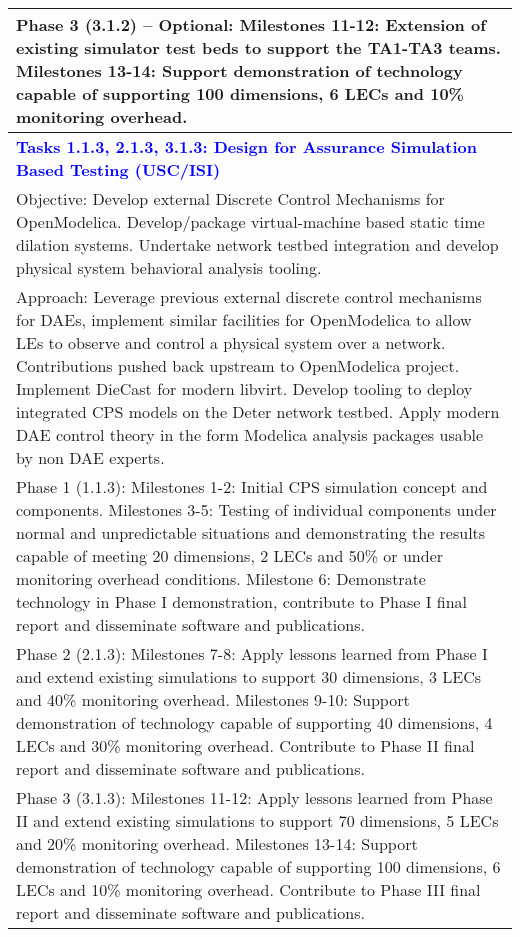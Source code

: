 {\begin{longtable} {|p{\textwidth} | }
Phase 3 (3.1.2) – Optional:  Milestones 11-12:  Extension of existing simulator test beds to support the TA1-TA3 teams.  Milestones 13-14:  Support demonstration of technology capable of supporting 100 dimensions, 6 LECs and 10\% monitoring overhead. \\ \hline
\textcolor{blue} {\footnotesize {\textbf{Tasks 1.1.3, 2.1.3, 3.1.3: Design for Assurance Simulation Based Testing (USC/ISI)}}} \\ \hline
Objective:  Develop external Discrete Control Mechanisms for OpenModelica.  Develop/package virtual-machine based static time dilation systems. Undertake network testbed integration and develop physical system behavioral analysis tooling. \\ \hline
Approach:  Leverage previous external discrete control mechanisms for DAEs, implement similar facilities for OpenModelica to allow LEs to observe and control a physical system over a network. Contributions pushed back upstream to OpenModelica project.  Implement DieCast for modern libvirt.  Develop tooling to deploy integrated CPS models on the Deter network testbed. Apply modern DAE control theory in the form Modelica analysis packages usable by non DAE experts. \\ \hline
Phase 1 (1.1.3):  Milestones 1-2:  Initial CPS simulation concept and components.  Milestones 3-5:  Testing of individual components under normal and unpredictable situations and demonstrating the results capable of meeting 20 dimensions, 2 LECs and 50\% or under monitoring overhead conditions.   Milestone 6: Demonstrate technology in Phase I demonstration, contribute to Phase I final report and disseminate software and publications. \\ \hline
Phase 2 (2.1.3):  Milestones 7-8:  Apply lessons learned from Phase I and extend existing simulations to support 30 dimensions, 3 LECs and 40\% monitoring overhead.  Milestones 9-10:  Support demonstration of technology capable of supporting 40 dimensions, 4 LECs and 30\% monitoring overhead.  Contribute to Phase II final report and disseminate software and publications. \\ \hline
Phase 3 (3.1.3):  Milestones 11-12:  Apply lessons learned from Phase II and extend existing simulations to support 70 dimensions, 5 LECs and 20\% monitoring overhead.  Milestones 13-14:  Support demonstration of technology capable of supporting 100 dimensions, 6 LECs and 10\% monitoring overhead.  Contribute to Phase III final report and disseminate software and publications. \\ \hline

\end{longtable}}
